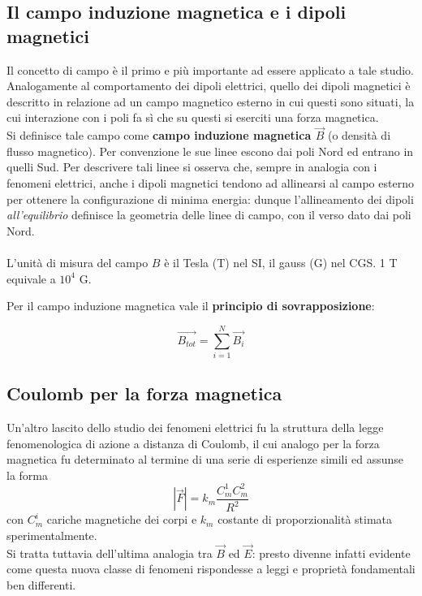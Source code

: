 \subsection{Il campo induzione magnetica e i dipoli magnetici}
Il concetto di campo è il primo e più importante ad essere applicato a tale studio. Analogamente al comportamento dei dipoli elettrici, quello dei dipoli magnetici è descritto in relazione ad un campo magnetico esterno in cui questi sono situati, la cui interazione con i poli fa sì che su questi si eserciti una forza magnetica.
\\Si definisce tale campo come \textbf{campo induzione magnetica $\vec{B}$} (o densità di flusso magnetico). Per convenzione le sue linee escono dai poli Nord ed entrano in quelli Sud. Per descrivere tali linee si osserva che, sempre in analogia con i fenomeni elettrici, anche i dipoli magnetici tendono ad allinearsi al campo esterno per ottenere la configurazione di minima energia: dunque l'allineamento dei dipoli \textit{all'equilibrio} definisce la geometria delle linee di campo, con il verso dato dai poli Nord.
\\~\\
L'unità di misura del campo $B$ è il Tesla (T) nel SI, il gauss (G) nel CGS. 1 T equivale a $10^4$ G.


Per il campo induzione magnetica vale il \textbf{principio di sovrapposizione}:

\[\vec{B_{tot}} = \sum\limits_{i=1}^{N} \vec{B_i}\]

\subsection{Coulomb per la forza magnetica}
Un'altro lascito dello studio dei fenomeni elettrici fu la struttura della legge fenomenologica di azione a distanza di Coulomb, il cui analogo per la forza magnetica fu determinato al termine di una serie di esperienze simili ed assunse la forma
\[|\vec{F}| = k_m \frac{C_m^1 C_m^2}{R^2}\]
con $C_m^i$ cariche magnetiche dei corpi e $k_m$ costante di proporzionalità stimata sperimentalmente.
\\Si tratta tuttavia dell'ultima analogia tra $\vec{B}$ ed $\vec{E}$: presto divenne infatti evidente come questa nuova classe di fenomeni rispondesse a leggi e proprietà fondamentali ben differenti.

